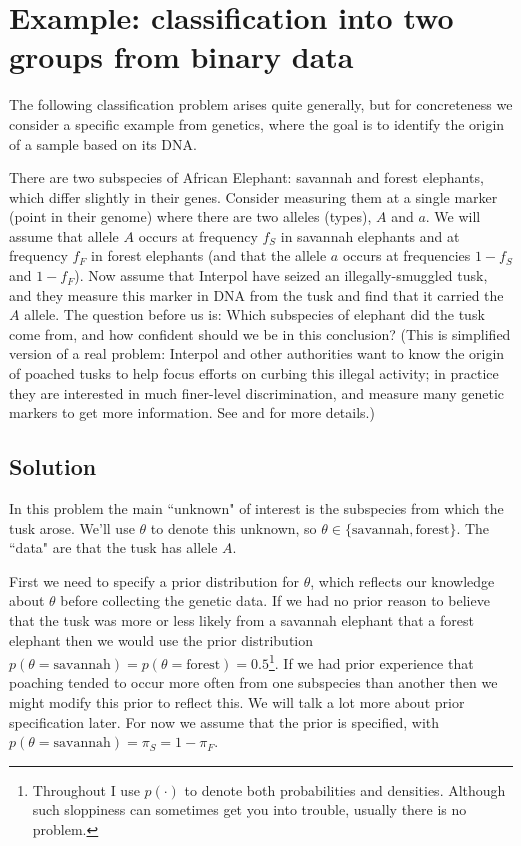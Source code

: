 \documentclass[times,11pt]{article}
\def\s{\mbox{savannah}}
\def\f{\mbox{forest}}
\def\ffA{f_F}
\def\fsA{f_S}
\def\pif{\pi_F}
\def\pis{\pi_S}
\begin{document}
\section*{Example: classification into two groups from binary data}

The following classification problem arises quite generally, but for concreteness we consider a 
specific example from genetics, where
the goal is to identify the origin of a sample based on its DNA.


There are two subspecies of African Elephant: savannah and forest elephants, which differ slightly in their genes. Consider measuring them at a single marker (point in their genome) where there are two alleles (types), $A$ and $a$. We will assume that allele $A$ occurs at frequency $\fsA$ in savannah elephants 
and at frequency $\ffA$ in forest elephants (and that the allele $a$ occurs at frequencies $1-\fsA$ and $1-\ffA$). Now assume that Interpol have seized an illegally-smuggled tusk, and they measure this marker in DNA from the tusk and find that it carried the $A$ allele. The question before us is: Which subspecies of elephant did the tusk come from, and how confident should we be in this conclusion? (This is simplified version of a real problem: Interpol and other authorities want to know the origin of poached tusks to help focus efforts on curbing this illegal activity; in practice they are interested in much finer-level discrimination, and measure many genetic markers to get more information. See
\cite{wasser.etal.07} and \cite{wasser.etal.08}
for more details.)


\subsection*{Solution}

In this problem the main ``unknown" of interest is the subspecies from which the tusk arose. We'll use $\theta$ to denote this unknown, so $\theta \in \{\s,\f\}$. The ``data" are that the tusk has allele $A$.

First we need to specify a prior distribution for $\theta$, which reflects our knowledge about $\theta$ before collecting the genetic data. If we had no prior reason to believe that the tusk was more or less likely from a savannah elephant that a forest elephant then we would use the prior distribution $p(\theta=\s) = p(\theta=\f) = 0.5$\footnote{Throughout I use $p(\cdot)$ to denote both probabilities and densities. Although such sloppiness can sometimes get you into trouble, usually there is no problem.}. If we had prior experience that poaching tended to occur more often from one subspecies than another then we might modify this prior to reflect this. We will talk a lot more about prior specification later. For now we assume that the prior is specified, with $p(\theta=\s)= \pis = 1-\pif$.
\end{document}
